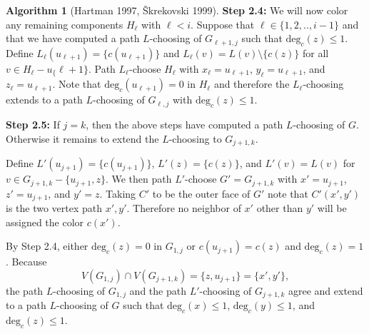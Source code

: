 \documentclass[12pt,letterpaper]{article}
\theoremstyle{plain}
\theoremstyle{definition}
\theoremstyle{break}
\newtheorem{algorithm}[lemma]{Algorithm}     %
\begin{document}
\begin{algorithm}[Hartman 1997, \v{S}krekovski 1999]
    \textbf{Step 2.4:} We will
    now color any remaining components $H_\ell$ with
    $\ell<i$. Suppose that $\ell\in \{1,2,..,i-1\}$ and that we have
    computed a path
    $L$-choosing of $G_{\ell+1,j}$ such that $\text{deg}_c(z)\le 1$. Define
    $L_\ell(u_{\ell+1})=\{c(u_{\ell+1})\}$
    and $L_\ell(v)=L(v)\setminus\{c(z)\}$
    for all $v\in H_\ell-u_\{\ell+1\}$. Path $L_\ell$-choose $H_\ell$ with
    $x_\ell=u_{\ell+1}$, $y_\ell=u_{\ell+1}$, and $z_\ell=u_{\ell+1}$.
    Note that $\text{deg}_c(u_{\ell+1})=0$ in $H_\ell$ and therefore the
    $L_\ell$-choosing
    extends to a path $L$-choosing of $G_{\ell,j}$ with $\text{deg}_c(z)\le
    1$.

    \textbf{Step 2.5:} If $j=k$, then the above steps have computed a path
    $L$-choosing of $G$. Otherwise it remains to extend the $L$-choosing
    to $G_{j+1,k}$.

    Define $L'(u_{j+1})=\{c(u_{j+1})\}$, $L'(z)=\{c(z)\}$, and $L'(v)=L(v)$ for
    $v\in G_{j+1,k}-\{u_{j+1},z\}$. We
    then path $L'$-choose $G'=G_{j+1,k}$ with $x'=u_{j+1}$,
    $z'=u_{j+1}$, and $y'=z$.
    Taking $C'$ to be the outer face of $G'$ note that
    $C'(x',y')$ is the two vertex path $x',y'$. Therefore no neighbor of $x'$
    other than $y'$ will be assigned the color $c(x')$.

    By Step 2.4, either $\text{deg}_c(z)=0$ in $G_{1,j}$ or
    $c(u_{j+1})=c(z)$ and $\text{deg}_c(z)=1$.
    Because
    $$V(G_{1,j})\cap V(G_{j+1,k})=\{z,u_{j+1}\}=\{x',y'\},$$
    the path
    $L$-choosing of $G_{1,j}$ and the path $L'$-choosing of $G_{j+1,k}$
    agree and extend to a path $L$-choosing of $G$ such that
    $\text{deg}_c(x)\le1$,
    $\text{deg}_c(y)\le 1$, and $\text{deg}_c(z)\le 1$.
\end{algorithm}
\end{document}
